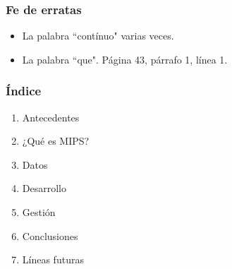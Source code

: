 \begin{frame}
	\frametitle{Fe de erratas}
	
	\begin{itemize}
		\item La palabra ``cont\'inuo" varias veces.
		\item La palabra ``que". P\'agina 43, p\'arrafo 1, l\'inea 1.
	\end{itemize}
\end{frame}

\begin{frame}
	\frametitle{\'Indice}
	\begin{enumerate}
		\item Antecedentes
		\item ¿Qu\'e es MIPS?
		\item Datos
		\item Desarrollo
		\item Gesti\'on
		\item Conclusiones
		\item L\'ineas futuras
	\end{enumerate}
\end{frame}
